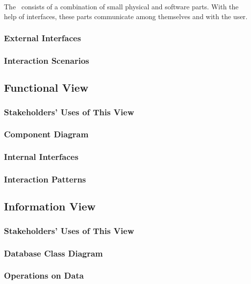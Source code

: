 The \afetbilgi\ consists of a combination of small physical and software parts. With the help of interfaces, these parts communicate among themselves and with the user.

\subsubsection{External Interfaces}

\subsubsection{Interaction Scenarios}

\subsection{Functional View}

\subsubsection{Stakeholders' Uses of This View}

\subsubsection{Component Diagram}

\subsubsection{Internal Interfaces}

\subsubsection{Interaction Patterns}

\subsection{Information View}

\subsubsection{Stakeholders' Uses of This View}

\subsubsection{Database Class Diagram}

\subsubsection{Operations on Data}

